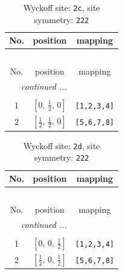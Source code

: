 \documentclass[fleqn,8pt]{jsarticle}
\begin{document}
\begin{longtable}{ccc}
\caption{Wyckoff site: {\tt 2c}, site symmetry: {\tt 222}}
 \\
 \hline \hline
No. & position & mapping \\ \hline \endfirsthead

\multicolumn{2}{l}{\tablename\ \thetable{}} \\
 \hline \hline
No. & position & mapping \\ \hline \endhead

 \hline \hline
\multicolumn{2}{r}{\footnotesize\it continued ...} \\ \endfoot

 \hline \hline
\multicolumn{2}{r}{} \\ \endlastfoot

1 & $\left[ 0,\, \frac{1}{2},\, 0 \right]$ & {\tt [1,2,3,4]} \\ \hline
2 & $\left[ \frac{1}{2},\, \frac{1}{2},\, 0 \right]$ & {\tt [5,6,7,8]} \\
\end{longtable}
\renewcommand{\arraystretch}{1.2}
\begin{longtable}{ccc}
\caption{Wyckoff site: {\tt 2d}, site symmetry: {\tt 222}}
 \\
 \hline \hline
No. & position & mapping \\ \hline \endfirsthead

\multicolumn{2}{l}{\tablename\ \thetable{}} \\
 \hline \hline
No. & position & mapping \\ \hline \endhead

 \hline \hline
\multicolumn{2}{r}{\footnotesize\it continued ...} \\ \endfoot

 \hline \hline
\multicolumn{2}{r}{} \\ \endlastfoot

1 & $\left[ 0,\, 0,\, \frac{1}{2} \right]$ & {\tt [1,2,3,4]} \\ \hline
2 & $\left[ \frac{1}{2},\, 0,\, \frac{1}{2} \right]$ & {\tt [5,6,7,8]} \\
\end{longtable}
\renewcommand{\arraystretch}{1.2}
\end{document}
